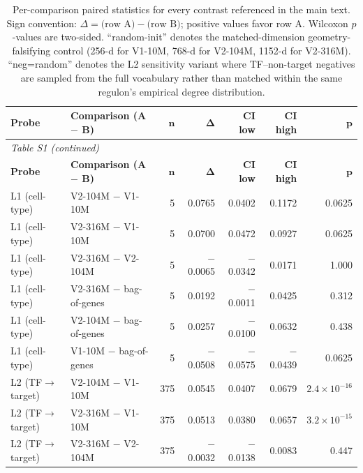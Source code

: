 \documentclass[11pt]{article}
\begin{document}
\renewcommand{\arraystretch}{1.15}
{\small
\setlength{\tabcolsep}{3pt}
\begin{longtable}{@{}l p{4.6cm} r r r r r@{}}
\caption{Per-comparison paired statistics for every contrast referenced in the main text. Sign convention: $\Delta = \text{(row A)} - \text{(row B)}$; positive values favor row A. Wilcoxon $p$-values are two-sided. ``random-init'' denotes the matched-dimension geometry-falsifying control (256-d for V1-10M, 768-d for V2-104M, 1152-d for V2-316M). ``neg=random'' denotes the L2 sensitivity variant where TF--non-target negatives are sampled from the full vocabulary rather than matched within the same regulon's empirical degree distribution.}
\label{tab:s1-per-comparison} \\
\toprule
\textbf{Probe} & \textbf{Comparison (A \(-\) B)} & \(\boldsymbol{n}\) & \(\boldsymbol{\Delta}\) & \textbf{CI low} & \textbf{CI high} & \(\boldsymbol{p}\) \\
\midrule
\endfirsthead
\multicolumn{7}{l}{\textit{Table S1 (continued)}}\\
\toprule
\textbf{Probe} & \textbf{Comparison (A \(-\) B)} & \(\boldsymbol{n}\) & \(\boldsymbol{\Delta}\) & \textbf{CI low} & \textbf{CI high} & \(\boldsymbol{p}\) \\
\midrule
\endhead
L1 (cell-type) & V2-104M $-$ V1-10M           &   5 &  0.0765 &  0.0402 &  0.1172 & 0.0625 \\
L1 (cell-type) & V2-316M $-$ V1-10M           &   5 &  0.0700 &  0.0472 &  0.0927 & 0.0625 \\
L1 (cell-type) & V2-316M $-$ V2-104M          &   5 & $-$0.0065 & $-$0.0342 &  0.0171 & 1.000 \\
L1 (cell-type) & V2-316M $-$ bag-of-genes     &   5 &  0.0192 & $-$0.0011 &  0.0425 & 0.312 \\
L1 (cell-type) & V2-104M $-$ bag-of-genes     &   5 &  0.0257 & $-$0.0100 &  0.0632 & 0.438 \\
L1 (cell-type) & V1-10M  $-$ bag-of-genes     &   5 & $-$0.0508 & $-$0.0575 & $-$0.0439 & 0.0625 \\
\midrule
L2 (TF$\to$target) & V2-104M $-$ V1-10M       & 375 &  0.0545 &  0.0407 &  0.0679 & $2.4\times10^{-16}$ \\
L2 (TF$\to$target) & V2-316M $-$ V1-10M       & 375 &  0.0513 &  0.0380 &  0.0657 & $3.2\times10^{-15}$ \\
L2 (TF$\to$target) & V2-316M $-$ V2-104M      & 375 & $-$0.0032 & $-$0.0138 &  0.0083 & 0.447 \\

\end{longtable}}
\end{document}
